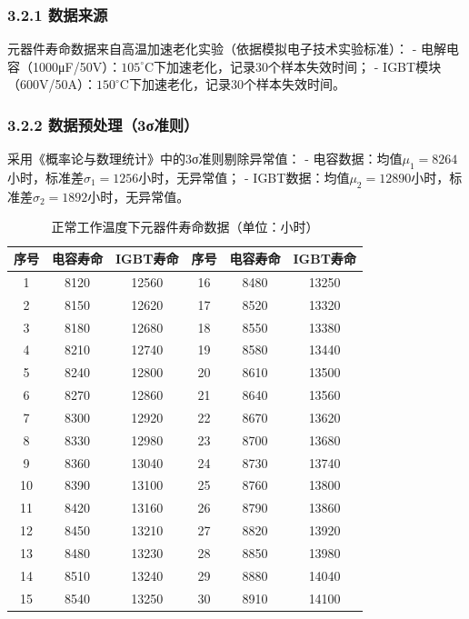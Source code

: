 \documentclass{article}
\begin{document}
\subsubsection*{3.2.1 数据来源}
元器件寿命数据来自高温加速老化实验（依据模拟电子技术实验标准）：
- 电解电容（1000μF/50V）：$105^\circ\text{C}$下加速老化，记录30个样本失效时间；
- IGBT模块（600V/50A）：$150^\circ\text{C}$下加速老化，记录30个样本失效时间。

\subsubsection*{3.2.2 数据预处理（3σ准则）}
采用《概率论与数理统计》中的3σ准则剔除异常值：
- 电容数据：均值$\mu_1=8264$小时，标准差$\sigma_1=1256$小时，无异常值；
- IGBT数据：均值$\mu_2=12890$小时，标准差$\sigma_2=1892$小时，无异常值。

\begin{table}[H]
    \centering
    \caption{正常工作温度下元器件寿命数据（单位：小时）}
    \begin{tabular}{|c|c|c|c|c|c|}
        \hline
        序号 & 电容寿命 & IGBT寿命 & 序号 & 电容寿命 & IGBT寿命 \\
        \hline
        1 & 8120 & 12560 & 16 & 8480 & 13250 \\
        \hline
        2 & 8150 & 12620 & 17 & 8520 & 13320 \\
        \hline
        3 & 8180 & 12680 & 18 & 8550 & 13380 \\
        \hline
        4 & 8210 & 12740 & 19 & 8580 & 13440 \\
        \hline
        5 & 8240 & 12800 & 20 & 8610 & 13500 \\
        \hline
        6 & 8270 & 12860 & 21 & 8640 & 13560 \\
        \hline
        7 & 8300 & 12920 & 22 & 8670 & 13620 \\
        \hline
        8 & 8330 & 12980 & 23 & 8700 & 13680 \\
        \hline
        9 & 8360 & 13040 & 24 & 8730 & 13740 \\
        \hline
        10 & 8390 & 13100 & 25 & 8760 & 13800 \\
        \hline
        11 & 8420 & 13160 & 26 & 8790 & 13860 \\
        \hline
        12 & 8450 & 13210 & 27 & 8820 & 13920 \\
        \hline
        13 & 8480 & 13230 & 28 & 8850 & 13980 \\
        \hline
        14 & 8510 & 13240 & 29 & 8880 & 14040 \\
        \hline
        15 & 8540 & 13250 & 30 & 8910 & 14100 \\
        \hline
    \end{tabular}
\end{table}
\end{document}
